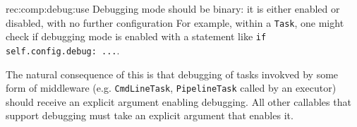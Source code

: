 \begin{recommendation}
    {rec:comp:debug:use}
    {Debugging mode should be binary: it is either enabled or disabled, with no further configuration}
    For example, within a \texttt{Task}, one might check if debugging mode is
    enabled with a statement like \texttt{if self.config.debug: ...}.
\end{recommendation}

The natural consequence of this is that debugging of tasks invokved by some
form of middleware (e.g. \texttt{CmdLineTask}, \texttt{PipelineTask} called by
an executor) should receive an explicit argument enabling debugging. All other
callables that support debugging must take an explicit argument that enables
it.
